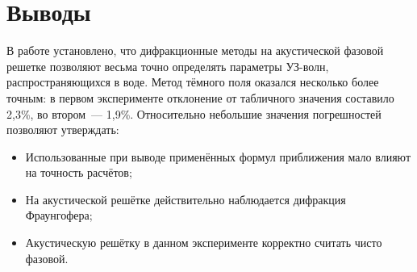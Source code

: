 \section{Выводы}
В работе установлено, что дифракционные методы на акустической фазовой решетке позволяют весьма точно определять параметры УЗ-волн, распространяющихся в воде. Метод тёмного поля оказался несколько более точным: в первом эксперименте отклонение от табличного значения составило 2,3\%, во втором~--- 1,9\%. Относительно небольшие значения погрешностей позволяют утверждать:
\begin{itemize}
    \item Использованные при выводе применённых формул приближения мало влияют на точность расчётов;
    \item На акустической решётке действительно наблюдается дифракция Фраунгофера;
    \item Акустическую решётку в данном эксперименте корректно считать чисто фазовой.
\end{itemize}